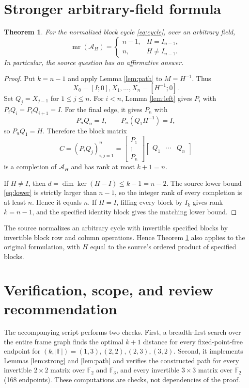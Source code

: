 \documentclass[11pt]{article}
\newtheorem{theorem}{Theorem}
\newcommand{\F}{\mathbb F}
\newcommand{\mr}{\operatorname{mr}}
\begin{document}
\section{Stronger arbitrary-field formula}

\begin{theorem}\label{thm:main}
For the normalized block cycle \eqref{eq:cycle}, over an arbitrary field,
\[
 \mr(\mathcal A_H)=
 \begin{cases}
 n-1,&H=I_{n-1},\\
 n,&H\ne I_{n-1}.
 \end{cases}
\]
In particular, the source question has an affirmative answer.
\end{theorem}

\begin{proof}
Put $k=n-1$ and apply Lemma \ref{lem:path} to $M=H^{-1}$.  Thus
\[
 X_0=[I;0],X_1,\ldots,X_n=[H^{-1};0].
\]
Set $Q_j=X_{j-1}$ for $1\le j\le n$.  For $i<n$, Lemma \ref{lem:left}
gives $P_i$ with $P_iQ_i=P_iQ_{i+1}=I$.  For the final edge, it gives $P_n$
with
\[
 P_nQ_n=I,\qquad P_n(Q_1H^{-1})=I,
\]
so $P_nQ_1=H$.  Therefore the block matrix
\[
 C=(P_iQ_j)_{i,j=1}^n
 =\begin{bmatrix}P_1\\ \vdots\\P_n\end{bmatrix}
   \begin{bmatrix}Q_1&\cdots&Q_n\end{bmatrix}
\]
is a completion of $\mathcal A_H$ and has rank at most $k+1=n$.

If $H\ne I$, then $d=\dim\ker(H-I)\le k-1=n-2$.  The source lower bound
\eqref{eq:lower} is strictly larger than $n-1$, so the integer rank of every
completion is at least $n$.  Hence it equals $n$.  If $H=I$, filling every
block by $I_k$ gives rank $k=n-1$, and the specified identity block gives the
matching lower bound.
\end{proof}

The source normalizes an arbitrary cycle with invertible specified blocks by
invertible block row and column operations.  Hence Theorem \ref{thm:main}
also applies to the original formulation, with $H$ equal to the source's
ordered product of specified blocks.

\section{Verification, scope, and review recommendation}

The accompanying script performs two checks.  First, a breadth-first search
over the entire frame graph finds the optimal $k+1$ distance for every
fixed-point-free endpoint for $(k,|\F|)=(1,3),(2,2),(2,3),(3,2)$.  Second,
it implements Lemmas \ref{lem:strong} and \ref{lem:path} and verifies the
constructed path for every invertible $2\times2$ matrix over $\F_2$ and
$\F_3$, and every invertible $3\times3$ matrix over $\F_2$ (168 endpoints).
These computations are checks, not dependencies of the proof.
\end{document}
